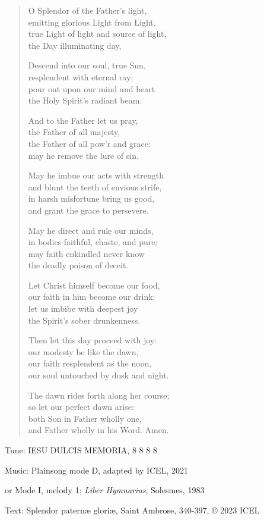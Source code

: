 \hymn

\begin{verse}
O Splendor of the Father’s light,\\
emitting glorious Light from Light,\\
true Light of light and source of light,\\
the Day illuminating day,

Descend into our soul, true Sun,\\
resplendent with eternal ray;\\
pour out upon our mind and heart\\
the Holy Spirit’s radiant beam.

And to the Father let us pray,\\
the Father of all majesty,\\
the Father of all pow’r and grace:\\
may he remove the lure of sin.

May he imbue our acts with strength\\
and blunt the teeth of envious strife,\\
in harsh misfortune bring us good,\\
and grant the grace to persevere.

May he direct and rule our minds,\\
in bodies faithful, chaste, and pure;\\
may faith enkindled never know\\
the deadly poison of deceit.

Let Christ himself become our food,\\
our faith in him become our drink;\\
let us imbibe with deepest joy\\
the Spirit’s sober drunkenness.

Then let this day proceed with joy:\\
our modesty be like the dawn,\\
our faith resplendent as the noon,\\
our soul untouched by dusk and night.

The dawn rides forth along her course;\\
so let our perfect dawn arise:\\
both Son in Father wholly one,\\
and Father wholly in his Word. Amen.
\end{verse}

\begin{hymnsource}
Tune: IESU DULCIS MEMORIA, 8 8 8 8

Music: Plainsong mode D, adapted by ICEL, 2021

or Mode I, melody 1; \emph{Liber Hymnarius}, Solesmes, 1983

Text: Splendor paternæ gloriæ, Saint Ambrose, 340-397, © 2023 ICEL
\end{hymnsource}
